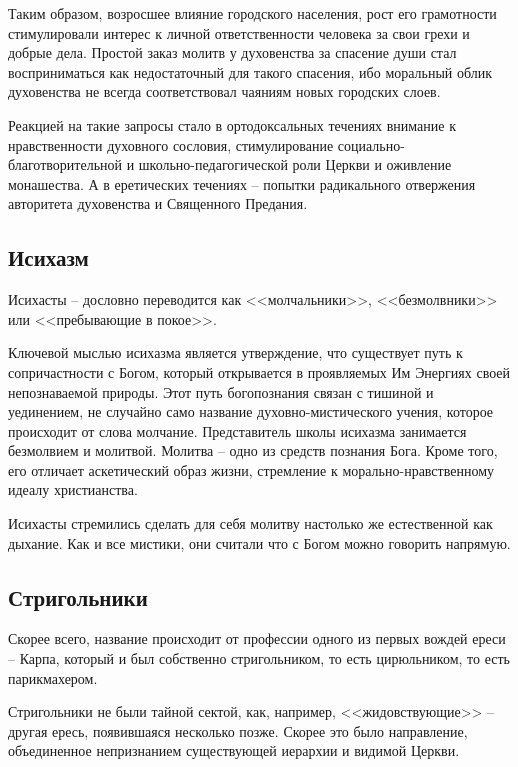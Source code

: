 \documentclass[12pt]{article}
\newcommand{\teal}[1]{\textcolor{teal}{#1}}
\begin{document}
  Таким образом, возросшее влияние городского населения,
  рост его грамотности стимулировали интерес к личной ответственности человека за свои грехи и добрые дела.
  Простой заказ молитв у духовенства за спасение души стал восприниматься как недостаточный для такого спасения,
  ибо моральный облик духовенства не всегда соответствовал чаяниям новых городских слоев.

  Реакцией на такие запросы стало в ортодоксальных течениях внимание к нравственности духовного сословия,
  стимулирование социально-благотворительной и школьно-педагогической роли Церкви и оживление монашества.
  А в еретических течениях -- попытки радикального отвержения авторитета духовенства и Священного Предания.

  \subsection{Исихазм}
  Исихасты -- дословно переводится как <<молчальники>>, <<безмолвники>> или <<пребывающие в покое>>.

  Ключевой мыслью исихазма является утверждение, что существует путь к сопричастности с Богом,
  который открывается в проявляемых Им Энергиях своей непознаваемой природы.
  Этот путь богопознания связан с тишиной и уединением, не случайно само название духовно-мистического учения,
  которое происходит от слова молчание.
  Представитель школы исихазма занимается безмолвием и молитвой.
  Молитва -- одно из средств познания Бога.
  Кроме того, его отличает аскетический образ жизни, стремление к морально-нравственному идеалу христианства.

  Исихасты стремились сделать для себя молитву настолько же естественной как дыхание.
  Как и все мистики, они считали что с Богом можно говорить напрямую.

  \subsection{Стригольники}
  Скорее всего, название происходит от профессии одного из первых вождей ереси -- Карпа, который и был собственно стригольником,
  то есть цирюльником, то есть парикмахером.

  Стригольники не были тайной сектой, как, например, <<жидовствующие>> -- другая ересь,
  появившаяся несколько позже.
  Скорее это было направление, объединенное непризнанием существующей иерархии и видимой Церкви.
\end{document}
